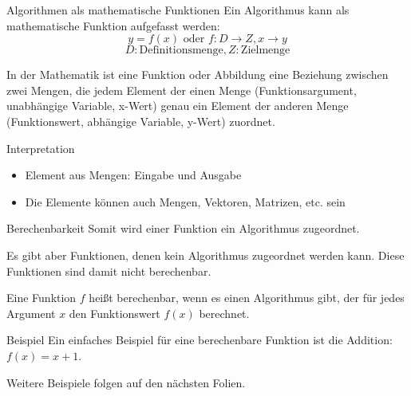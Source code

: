 \documentclass[xelatex,aspectratio=169]{beamer}
\begin{document}
\begin{frame}{Algorithmen als mathematische Funktionen}
  Ein Algorithmus kann als mathematische Funktion aufgefasst werden:
  \[ y = f \left(x\right) \mbox{ oder } f: D \rightarrow Z, x \rightarrow y \]
  \[ D: \mbox{Definitionsmenge}, Z: \mbox{Zielmenge} \]

  \begin{definition}
    In der Mathematik ist eine Funktion oder Abbildung eine Beziehung zwischen zwei Mengen, die jedem Element der einen Menge (Funktionsargument, unabhängige Variable, x-Wert) genau ein Element der anderen Menge (Funktionswert, abhängige Variable, y-Wert) zuordnet.
  \end{definition}
  \begin{block}{Interpretation}
    \begin{itemize}
      \item Element aus Mengen: Eingabe und Ausgabe
      \item Die Elemente können auch Mengen, Vektoren, Matrizen, etc. sein
    \end{itemize}
  \end{block}
\end{frame}

\begin{frame}{Berechenbarkeit}
  Somit wird einer Funktion ein Algorithmus zugeordnet.

  Es gibt aber Funktionen, denen kein Algorithmus zugeordnet werden kann. Diese Funktionen sind damit nicht berechenbar.

  \begin{definition}
    Eine Funktion $f$ heißt berechenbar, wenn es einen Algorithmus gibt, der für jedes Argument $x$ den Funktionswert $f\left(x\right)$ berechnet.
  \end{definition}

  \begin{exampleblock}{Beispiel}
    Ein einfaches Beispiel für eine berechenbare Funktion ist die Addition: $f\left(x\right) = x + 1$.
  \end{exampleblock}

  Weitere Beispiele folgen auf den nächsten Folien.

\end{frame}
\end{document}

